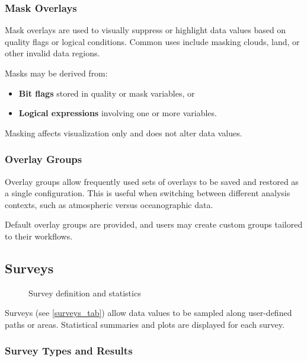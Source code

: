 \subsubsection*{Mask Overlays}

Mask overlays are used to visually suppress or highlight data values
based on quality flags or logical conditions. Common uses include
masking clouds, land, or other invalid data regions.

Masks may be derived from:
\begin{itemize}
  \item \textbf{Bit flags} stored in quality or mask variables, or
  \item \textbf{Logical expressions} involving one or more variables.
\end{itemize}

Masking affects visualization only and does not alter data values.

\subsubsection*{Overlay Groups}

Overlay groups allow frequently used sets of overlays to be saved and
restored as a single configuration. This is useful when switching
between different analysis contexts, such as atmospheric versus
oceanographic data.

Default overlay groups are provided, and users may create custom groups
tailored to their workflows.

\subsection{Surveys}

\begin{figure}
  \begin{center}
    \caption{Survey definition and statistics}
    \label{surveys_tab}
  \end{center}
\end{figure}

Surveys (see \autoref{surveys_tab}) allow data values to be sampled along user-defined paths or areas.
Statistical summaries and plots are displayed for each survey.

\subsubsection*{Survey Types and Results}

